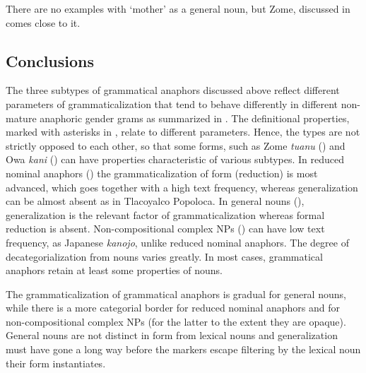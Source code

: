 \documentclass[output=collectionpaper]{langsci/langscibook}
\begin{document}
There are no examples with ‘mother’ as a general noun, but Zome, discussed in  comes close to it.


\subsection{Conclusions}
\label{sec:BW:5.5}

The three subtypes of grammatical anaphors discussed above reflect different parameters of grammaticalization that tend to behave differently in different non-mature anaphoric gender grams as summarized in . The definitional properties, marked with asterisks in , relate to different parameters. Hence, the types are not strictly opposed to each other, so that some forms, such as Zome \textit{tuanu} () and Owa \textit{kani} () can have properties characteristic of various subtypes. In reduced nominal anaphors () the grammaticalization of form (reduction) is most advanced, which goes together with a high text frequency, whereas generalization can be almost absent as in Tlacoyalco Popoloca. In general nouns (), generalization is the relevant factor of grammaticalization whereas formal reduction is absent. Non-compositional complex NPs () can have low text frequency, as Japanese \textit{kanojo}, unlike reduced nominal anaphors. The degree of decategorialization from nouns varies greatly. In most cases, grammatical anaphors retain at least some properties of nouns.


\begin{table}
\caption{Different properties of the subtypes of grammatical anaphors}
\label{tab:BW:10}
\end{table}

The grammaticalization of grammatical anaphors is gradual for general nouns, while there is a more categorial border for reduced nominal anaphors and for non-compositional complex NPs (for the latter to the extent they are opaque). General nouns are not distinct in form from lexical nouns and generalization must have gone a long way before the markers escape filtering by the lexical noun their form instantiates.
\end{document}
